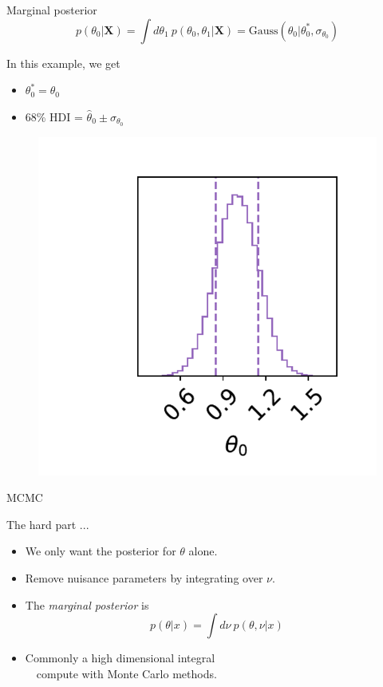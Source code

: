 \documentclass[
aspectratio=169,
14pt,
professionalfonts
]{beamer}
\newcommand{\arrow}{~\ding{220}~}
\begin{document}
\begin{frame}{Marginal posterior}
\vspace{-1cm}
    $$p(\theta_0|\boldsymbol{X}) = \int d\theta_1 ~ p(\theta_0, \theta_1|\boldsymbol{X}) = \text{Gauss}(\theta_0 | \theta_0^*, \sigma_{\theta_0})$$
    \begin{minipage}{0.4\linewidth}
    In this example, we get
        \begin{itemize}
            \item $\theta_0^* = \hat \theta_0$
            \item 68\% HDI = $\hat \theta_0 \pm \sigma_{\theta_0}$
        \end{itemize}
    \end{minipage}
    \begin{minipage}{0.59\linewidth}
    \begin{figure}
        \centering
        \includegraphics[width=0.7\linewidth]{../plots/marginal_posterior.pdf}
    \end{figure}
    \end{minipage}
\end{frame}

\begin{frame}
\center
\Large
MCMC
\end{frame}

\begin{frame}{The hard part ...}
\begin{itemize}
    \item We only want the posterior for $\theta$ alone.
    \item Remove nuisance parameters by integrating over $\nu$.
    \item[\arrow] The \textit{marginal posterior} is
        $$
        p(\theta | x) = \int d\nu ~ p(\theta, \nu | x)
        $$
    \item Commonly a high dimensional integral\\ \arrow compute with Monte Carlo methods.
\end{itemize}
\end{frame}
\end{document}
